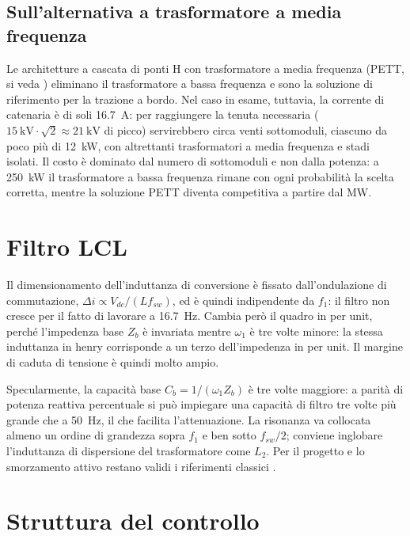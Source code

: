 \documentclass[11pt,a4paper]{article}
\begin{document}
\subsection{Sull'alternativa a trasformatore a media frequenza}

Le architetture a cascata di ponti H con trasformatore a media frequenza (PETT, si veda
\cite{steiner2007,zhao2014}) eliminano il trasformatore a bassa frequenza e sono la
soluzione di riferimento per la trazione a bordo. Nel caso in esame, tuttavia, la
corrente di catenaria è di soli \SI{16.7}{\ampere}: per raggiungere la tenuta necessaria
($\SI{15}{\kilo\volt}\cdot\sqrt{2}\approx\SI{21}{\kilo\volt}$ di picco) servirebbero
circa venti sottomoduli, ciascuno da poco più di \SI{12}{\kilo\watt}, con altrettanti
trasformatori a media frequenza e stadi isolati. Il costo è dominato dal numero di
sottomoduli e non dalla potenza: a \SI{250}{\kilo\watt} il trasformatore a bassa
frequenza rimane con ogni probabilità la scelta corretta, mentre la soluzione PETT
diventa competitiva a partire dal \si{\mega\watt}.

\section{Filtro LCL}

Il dimensionamento dell'induttanza di conversione è fissato dall'ondulazione di
commutazione, $\Delta i \propto V_{dc}/(L f_{sw})$, ed è quindi indipendente da $f_1$: il
filtro non cresce per il fatto di lavorare a \SI{16.7}{\hertz}. Cambia però il quadro in
per unit, perché l'impedenza base $Z_b$ è invariata mentre $\omega_1$ è tre volte minore:
la stessa induttanza in henry corrisponde a un terzo dell'impedenza in per unit. Il
margine di caduta di tensione è quindi molto ampio.

Specularmente, la capacità base $C_b = 1/(\omega_1 Z_b)$ è tre volte maggiore: a parità di
potenza reattiva percentuale si può impiegare una capacità di filtro tre volte più grande
che a \SI{50}{\hertz}, il che facilita l'attenuazione. La risonanza va collocata almeno
un ordine di grandezza sopra $f_1$ e ben sotto $f_{sw}/2$; conviene inglobare
l'induttanza di dispersione del trasformatore come $L_2$. Per il progetto e lo smorzamento
attivo restano validi i riferimenti classici \cite{liserre2005,pan2014}.

\section{Struttura del controllo}
\end{document}

